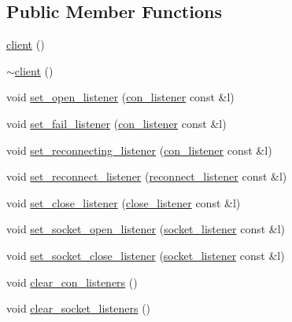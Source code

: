 \subsection*{Public Member Functions}
\begin{DoxyCompactItemize}
\item 
\hyperlink{classsio_1_1client_a409f7973576dd3ce5ae8d717d0962bcc}{client} ()
\item 
\hyperlink{classsio_1_1client_ac9ec4634825ee92ffdc37b145d04872e}{$\sim$client} ()
\item 
void \hyperlink{classsio_1_1client_a4cd8f0f1e1cc6cf0ee0e43c4b60cd2d6}{set\+\_\+open\+\_\+listener} (\hyperlink{classsio_1_1client_a23951b626c91c87e866d4e966ec828fa}{con\+\_\+listener} const \&l)
\item 
void \hyperlink{classsio_1_1client_aa771d523e50a3b431ed894133fec12aa}{set\+\_\+fail\+\_\+listener} (\hyperlink{classsio_1_1client_a23951b626c91c87e866d4e966ec828fa}{con\+\_\+listener} const \&l)
\item 
void \hyperlink{classsio_1_1client_a5d8ba15169b4fdb346c36359f2716d78}{set\+\_\+reconnecting\+\_\+listener} (\hyperlink{classsio_1_1client_a23951b626c91c87e866d4e966ec828fa}{con\+\_\+listener} const \&l)
\item 
void \hyperlink{classsio_1_1client_a321e1bcf29625eea691dab0cd1d78ee9}{set\+\_\+reconnect\+\_\+listener} (\hyperlink{classsio_1_1client_a62a35170a39347cb1e56e2105badcad1}{reconnect\+\_\+listener} const \&l)
\item 
void \hyperlink{classsio_1_1client_a85a00dc13d6c43d5fd710805e63569b1}{set\+\_\+close\+\_\+listener} (\hyperlink{classsio_1_1client_a9736334c566e7dcc6201ea5629024390}{close\+\_\+listener} const \&l)
\item 
void \hyperlink{classsio_1_1client_a49821e44c763e2b96def29bf4d2d00ad}{set\+\_\+socket\+\_\+open\+\_\+listener} (\hyperlink{classsio_1_1client_a02b43cadd1588575ae2465042452cabf}{socket\+\_\+listener} const \&l)
\item 
void \hyperlink{classsio_1_1client_ac95e53ccbde50dee8f314a26caf41bd3}{set\+\_\+socket\+\_\+close\+\_\+listener} (\hyperlink{classsio_1_1client_a02b43cadd1588575ae2465042452cabf}{socket\+\_\+listener} const \&l)
\item 
void \hyperlink{classsio_1_1client_a15eab3d354fef37eb2f7e671df494512}{clear\+\_\+con\+\_\+listeners} ()
\item 
void \hyperlink{classsio_1_1client_a07c0262b4ad4134fd5cc840a09fff93a}{clear\+\_\+socket\+\_\+listeners} ()
\item 

\end{DoxyCompactItemize}
